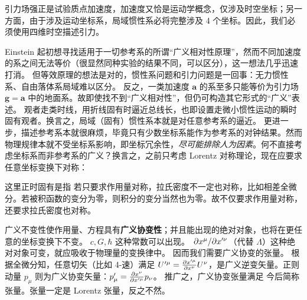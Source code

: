 引力场强正是试验质点加速度，加速度又恰是运动学概念，仅涉及时空坐标；另一方面，由于涉及运动坐标系，局域惯性系必将完整涉及 4 个坐标。因此，我们必须使用四维时空描述引力。
\begin{center}
\end{center}
Einstein 起初想寻找适用于一切参考系的所谓“广义相对性原理”，然而不同加速度的系之间无法等价（很显然同种实验的结果不同，可以区分），这一想法几乎迅速打消。
但等效原理的想法是对的，惯性系问题和引力问题是一回事：无力惯性系、自由落体系局域难以区分。
反之，一类加速度 $\bm a$ 的系至多只能等价为引力场 $\bm g=\bm a$ 中的地面系。故即使找不到“广义相对性”，但仍可构造其它形式的“广义”表述。
观者走类时线，用折线固有时逼近总线长，也即设置走微小惯性运动的瞬时固有观者。换言之，局域（固有）惯性系本就是对任意参考系的逼近。
更进一步，描述参考系本就很麻烦，毕竟只有少数坐标系能作为参考系的对钟结果。然而物理规律本就不受坐标系影响，即坐标冗余性，\emph{尽可能排除人为因素}。何不直接考虑坐标系而非参考系的广义？换言之，之前只考虑 Lorentz 对称理论，现在应要求任意坐标变换下对称：
\begin{center}
\end{center}
这里正时固有是指
若只要求作用量对称，拉氏密度不一定也对称，比如相差全微分。若被积函数的变分为零，则积分的变分当然也为零。故不仅要求作用量对称，还要求拉氏密度也对称。

广义不变性使作用量、方程具有\textbf{广义协变性}；并且能出现的绝对对象，也将在更任意的坐标变换下不变。
$c,G,\hbar$ 这种常数可以出现。
$\pdv*{x^\mu}{x'^\nu}$（代替 $\Lambda$）这种绝对对象可变，就应吸收于物理量的变换律中。
因而我们需要广义协变的张量。
根据全微分知，任意切矢（比如 4-速）满足 $U'^\mu=\pdv{x'^\mu}{x^\nu}U^\nu$，是广义逆变矢量。正则动量 $p_\mu$ 则为广义协变矢量：$p'_\mu=\pdv{x^\nu}{x'^\mu} p_\nu$。
推广之，广义协变张量满足
今后简称张量。张量一定是 Lorentz 张量，反之不然。


